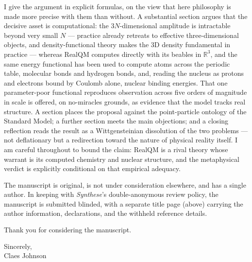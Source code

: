\documentclass[11pt]{article}
\begin{document}
\medskip
\noindent I give the argument in explicit formulas, on the view that here philosophy is made more precise
with them than without. A substantial section argues that the decisive asset is computational: the
$3N$-dimensional amplitude is intractable beyond very small $N$ --- practice already retreats to effective
three-dimensional objects, and density-functional theory makes the 3D density fundamental in practice ---
whereas RealQM computes directly with its beables in $\mathbb{R}^3$, and the same energy functional has
been used to compute atoms across the periodic table, molecular bonds and hydrogen bonds, and, reading the
nucleus as protons and electrons bound by Coulomb alone, nuclear binding energies. That one parameter-poor
functional reproduces observation across five orders of magnitude in scale is offered, on no-miracles
grounds, as evidence that the model tracks real structure. A section places the proposal against the
point-particle ontology of the Standard Model; a further section meets the main objections; and a closing
reflection reads the result as a Wittgensteinian dissolution of the two problems --- not deflationary but a
redirection toward the nature of physical reality itself. I am careful throughout to bound the claim: RealQM
is a rival theory whose warrant is its computed chemistry and nuclear structure, and the metaphysical
verdict is explicitly conditional on that empirical adequacy.

\medskip
\noindent The manuscript is original, is not under consideration elsewhere, and has a single author. In
keeping with \emph{Synthese}'s double-anonymous review policy, the manuscript is submitted blinded, with a
separate title page (above) carrying the author information, declarations, and the withheld reference
details.

\medskip
\noindent Thank you for considering the manuscript.

\vspace{1em}
\noindent Sincerely,\\
Claes Johnson
\end{document}

